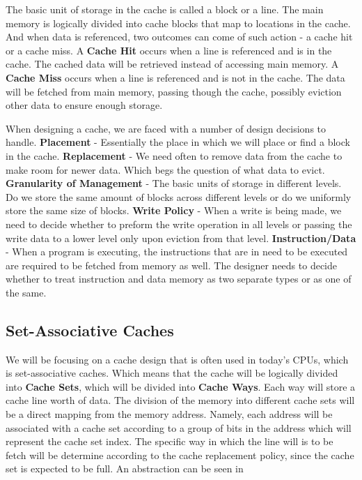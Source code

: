 The basic unit of storage in the cache is called a block or a line. The main
memory is logically divided into cache blocks that map to locations in the
cache. And when data is referenced, two outcomes can come of such action - a
cache hit or a cache miss. A \textbf{Cache Hit} occurs when a line is referenced
and is in the cache. The cached data will be retrieved instead of accessing main
memory.  A \textbf{Cache Miss} occurs when a line is referenced and is not in
the cache. The data will be fetched from main memory, passing though the cache,
possibly eviction other data to ensure enough storage.

When designing a cache, we are faced with a number of design decisions to
handle. \textbf{Placement}  - Essentially the place in which we will place or
find a block in the cache. \textbf{Replacement} - We need often to remove data
from the cache to make room for newer data. Which begs the question of what data
to evict. \textbf{Granularity of Management} - The basic units of storage in
different levels. Do we store the same amount of blocks across different levels
or do we uniformly store the same size of blocks. \textbf{Write Policy} - When a
write is being made, we need to decide whether to preform the write operation in
all levels or passing the write data to a lower level only upon eviction from
that level. \textbf{Instruction/Data} - When a program is executing, the
instructions that are in need to be executed are required to be fetched from
memory as well. The designer needs to decide whether to treat instruction and
data memory as two separate  types or as one of the same.


\subsection{Set-Associative Caches}
\label{subsec:setassoccaches}

We will be focusing on a cache design that is often used in today's CPUs, which
is set-associative caches. Which means that the cache will be logically divided
into \textbf{Cache Sets}, which will be divided into \textbf{Cache Ways}. Each
way will store a cache line worth of data. The division of the memory into
different cache sets will be a direct mapping from the memory address. Namely,
each address will be associated with a cache set according to a group of bits in
the address which will represent the cache set index. The specific way in which
the line will is to be fetch will be determine according to the cache
replacement policy, since the cache set is expected to be full.  An abstraction
can be seen in 


